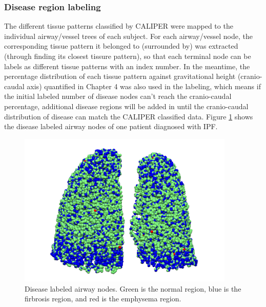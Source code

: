 \subsubsection{Disease region labeling}
The different tissue patterns classified by CALIPER were mapped to the individual airway/vessel trees of each subject. For each airway/vessel node, the corresponding tissue pattern it belonged to (surrounded by) was extracted (through finding its closest tissure pattern), so that each terminal node can be labels as different tissue patterns with an index number. In the meantime, the percentage distribution of each tissue pattern against gravitational height (cranio-caudal axis) quantified in Chapter 4 was also used in the labeling, which means if the initial labeled number of disease nodes can't reach the cranio-caudal percentage, additional disease regions will be added in until the cranio-caudal distribution of disease can match the CALIPER classified data. Figure \ref{fig:DiseaseLabeling} shows the disease labeled airway nodes of one patient diagnosed with IPF.
\newpage

\begin{figure}[htbp]
  \centering 
  \includegraphics[height=2.9in]{ModelBasedAnalysis/Image/IPF501_DiseaseDistribution_BasedVentilation.png}
  \caption{Disease labeled airway nodes. Green is the normal region, blue is the firbrosis region, and red is the emphysema region.}
  \label{fig:DiseaseLabeling}
\end{figure}

